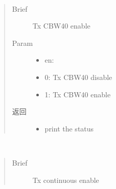 \documentclass[letterpaper,10pt,english]{sphinxhowto}
\begin{document}
\begin{fulllineitems}
\begin{fulllineitems}
\begin{quote}
\begin{description}
\begin{itemize}
\end{itemize}


\end{description}\end{quote}

\end{fulllineitems}


\begin{fulllineitems}
\label{\detokenize{rfapi/index:wifi_api.WIFIAPI.test_txtone_pwr}}
\end{fulllineitems}


\begin{fulllineitems}
\label{\detokenize{rfapi/index:wifi_api.WIFIAPI.tx_cbw40m_en}}~\begin{quote}\begin{description}
\item[{Brief}] \leavevmode
Tx CBW40 enable

\item[{Param}] \leavevmode\begin{itemize}
\item {} 
en:

\item {} 
0: Tx CBW40 disable

\item {} 
1: Tx CBW40 enable

\end{itemize}

\item[{返回}] \leavevmode
\begin{itemize}
\item {} 
print the status

\end{itemize}


\end{description}\end{quote}

\end{fulllineitems}


\begin{fulllineitems}
\label{\detokenize{rfapi/index:wifi_api.WIFIAPI.tx_contin_en}}~\begin{quote}\begin{description}
\item[{Brief}] \leavevmode
Tx continuous enable


\end{description}
\end{quote}
\end{fulllineitems}
\end{fulllineitems}
\end{document}

